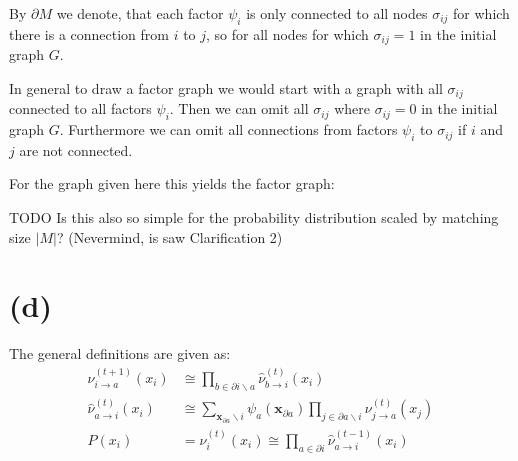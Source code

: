 \documentclass[a4paper]{scrartcl}
\begin{document}
By $\partial M$ we denote, that each factor $\psi_i$ is only connected to all nodes $\sigma_{ij}$ for which there is a connection from $i$ to $j$, so for all nodes for which $\sigma_{ij} = 1$ in the initial graph $G$.


In general to draw a factor graph we would start with a graph with all $\sigma_{ij}$ connected to all factors $\psi_i$. Then we can omit all $\sigma_{ij}$ where $\sigma_{ij} = 0$ in the initial graph $G$. Furthermore we can omit all connections from factors $\psi_i$ to $\sigma_{ij}$ if $i$ and $j$ are not connected. 

For the graph given here this yields the factor graph:




{\color{red}
TODO Is this also so simple for the probability distribution scaled by matching size $\lvert M \rvert$? (Nevermind, is saw Clarification 2)
}











\section*{(d)}

The general definitions are given as:
\begin{align}
    \nu_{i \rightarrow a}^{(t + 1)}(x_i) &\cong \prod_{b \in \partial i \backslash a} \hat{\nu}_{b \rightarrow i}^{(t)}(x_i) \\
    \hat{\nu}_{a \rightarrow i}^{(t)}(x_i) &\cong \sum_{\textbf{x}_{\partial a} \backslash i} \psi_a (\textbf{x}_{\partial a}) \prod_{j \in \partial a \backslash i} \nu_{j \rightarrow a}^{(t)}(x_j) \\
    P(x_i) &= \nu_i^{(t)}(x_i) \cong \prod_{a \in \partial i} \hat{\nu}_{a \rightarrow i}^{(t-1)}(x_i)
\end{align}
\end{document}
